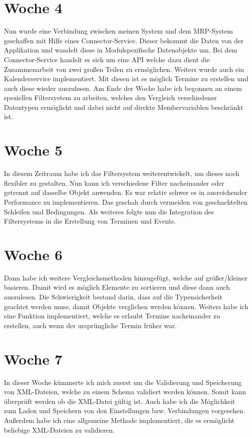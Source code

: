 \section{Woche 4}
Nun wurde eine Verbindung zwischen meinen System und dem MRP-System geschaffen mit Hilfe eines Connector-Service. Dieser bekommt die Daten von der Applikation und wandelt diese in Modulspezifische Datenobjekte um. Bei dem Connector-Service handelt es sich um eine API welche dazu dient die Zusammenarbeit von zwei großen Teilen zu ermöglichen. Weiters wurde auch ein Kalenderservice implementiert. Mit diesen ist es möglich Termine zu erstellen und auch diese wieder auszulesen. Am Ende der Woche habe ich begonnen an einem speziellen Filtersystem zu arbeiten, welches den Vergleich verschiedener Datentypen ermöglicht und dabei nicht auf direkte Membervariablen beschränkt ist.


\section{Woche 5}
In diesem Zeitraum habe ich das Filtersystem weiterentwickelt, um dieses noch flexibler zu gestalten. Nun kann ich verschiedene Filter nacheinander oder getrennt auf dasselbe Objekt anwenden. Es war relativ schwer es in ausreichender Performance zu implementieren. Das geschah durch vermeiden von geschachtelten Schleifen und Bedingungen. Als weiteres folgte nun die Integration des Filtersystems in die Erstellung von Terminen und Events.

\section{Woche 6}
 Dann habe ich weitere Vergleichsmethoden hinzugefügt, welche auf größer/kleiner basieren. Damit wird es möglich Elemente zu sortieren und diese dann auch auszulesen. Die Schwierigkeit bestand darin, dass auf die Typensicherheit geachtet werden muss, damit Objekte verglichen werden können. Weiters habe ich eine Funktion implementiert, welche es erlaubt Termine nacheinander zu erstellen, auch wenn der ursprüngliche Termin früher war.

\section{Woche 7}
In dieser Woche kümmerte ich mich zuerst um die Validierung und Speicherung von XML-Dateien, welche zu einem Schema validiert werden können. Somit kann überprüft werden ob die XML-Datei gültig ist. Auch habe ich die Möglichkeit zum Laden und Speichern von den Einstellungen bzw. Verbindungen vorgesehen.  Außerdem habe ich eine allgemeine Methode implementiert, die es ermöglicht beliebige XML-Dateien zu validieren.

